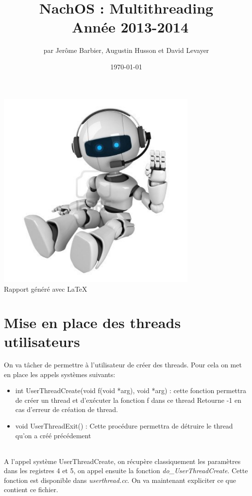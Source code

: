\documentclass[a4paper,10pt]{article}
\title{NachOS : Multithreading \\ Année 2013-2014}
\author{par Jerôme Barbier, Augustin Husson et David Levayer}
\date{\today}
\begin{document}
  \maketitle

  \begin{center}
    \includegraphics[width=10cm,height=10cm]{robottrading.jpg}\\
    Rapport généré avec \LaTeX
  \end{center}
  \tableofcontents
  \newpage
  \section{Mise en place des threads utilisateurs}
  On va tâcher de permettre à l'utilisateur de créer des threads. Pour cela on met en place les appels systèmes suivants:
  \begin{itemize}
   \item int UserThreadCreate(void f(void *arg), void *arg) : cette fonction permettra de créer un thread et d'exécuter la fonction f dans ce thread
   Retourne -1 en cas d'erreur de création de thread.
   \item void UserThreadExit() : Cette procédure permettra de détruire le thread qu'on a créé précédement
  \end{itemize}
  
  ~~\\
  
  A l'appel système UserThreadCreate, on récupère classiquement les paramètres dans les registres 4 et 5, on appel ensuite la fonction \emph{do\_UserThreadCreate}.
  Cette fonction est disponible dans \emph{userthread.cc}. On va maintenant expliciter ce que contient ce fichier. 
\end{document}
